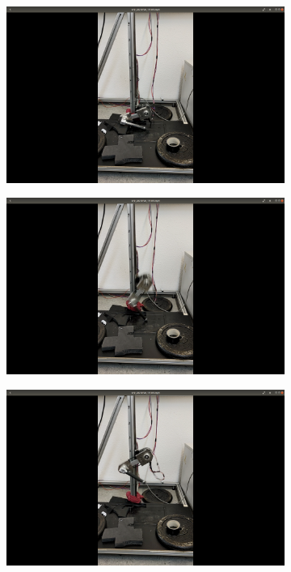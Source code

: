 \documentclass[onecolumn, letter paper]{report}
\begin{document}
\begin{figure}[htb!]
    \centering
    \begin{subfigure}{.24\textwidth}
    \includegraphics[width=\textwidth, trim={25cm 10cm 25cm 10cm}, clip]{figures/0.5m/p5m1.png}
    \end{subfigure}
    \begin{subfigure}{.24\textwidth}
    \includegraphics[width=\textwidth, trim={25cm 10cm 25cm 10cm}, clip]{figures/0.5m/p5m2.png}
    \end{subfigure}
    \begin{subfigure}{.24\textwidth}
    \includegraphics[width=\textwidth, trim={25cm 10cm 25cm 10cm}, clip]{figures/0.5m/p5m3.png}

\end{subfigure}
\end{figure}
\end{document}
